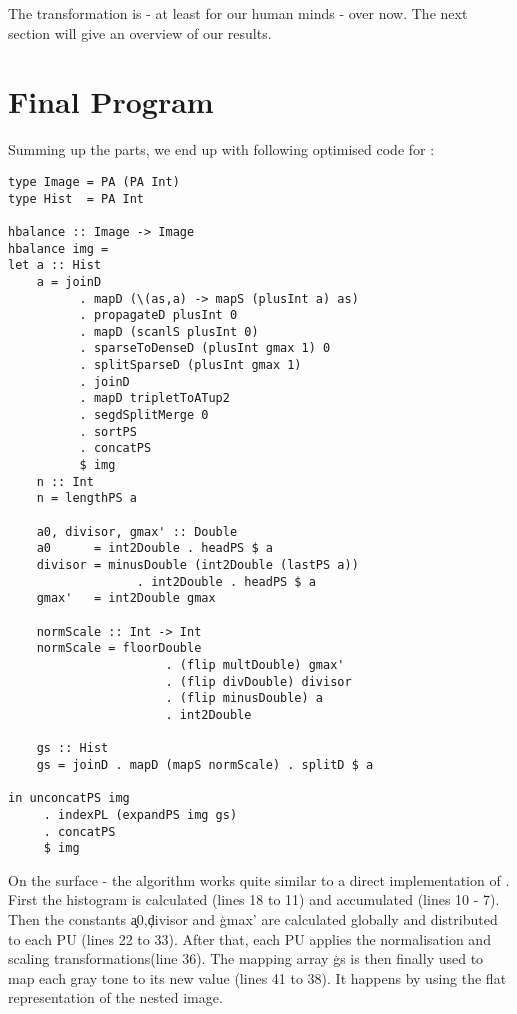      The transformation is - at least for our human minds - over now. The next
     section will give an overview of our results.
         
\section{Final Program}
  Summing up the parts, we end up with following optimised code for \ndpv:
  \begin{lstlisting}
type Image = PA (PA Int)
type Hist  = PA Int

hbalance :: Image -> Image
hbalance img =
let a :: Hist
    a = joinD
          . mapD (\(as,a) -> mapS (plusInt a) as)
          . propagateD plusInt 0
          . mapD (scanlS plusInt 0)
          . sparseToDenseD (plusInt gmax 1) 0
          . splitSparseD (plusInt gmax 1)
          . joinD
          . mapD tripletToATup2
          . segdSplitMerge 0
          . sortPS
          . concatPS
          $ img
    n :: Int
    n = lengthPS a
    
    a0, divisor, gmax' :: Double
    a0      = int2Double . headPS $ a
    divisor = minusDouble (int2Double (lastPS a))
                  . int2Double . headPS $ a
    gmax'   = int2Double gmax
    
    normScale :: Int -> Int
    normScale = floorDouble
                      . (flip multDouble) gmax'
                      . (flip divDouble) divisor
                      . (flip minusDouble) a
                      . int2Double
      
    gs :: Hist
    gs = joinD . mapD (mapS normScale) . splitD $ a
    
in unconcatPS img
     . indexPL (expandPS img gs)
     . concatPS
     $ img
  \end{lstlisting}
  On the surface - the algorithm works quite similar to a direct
  implementation of \ndpn.
  First the histogram is calculated (lines 18 to 11) and accumulated (lines 10 - 7).
  Then the constants \c{a0},\c{divisor} and \c{gmax'} are calculated globally and distributed
  to each PU (lines 22 to 33). After that, each PU applies the normalisation and scaling transformations(line 36).
  The mapping array \c{gs} is then finally used to map
  each gray tone to its new value (lines 41 to 38). It happens by using the
  flat representation of the nested image.
  
